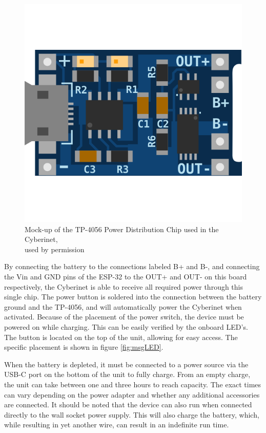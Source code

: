 \begin{center}
    \begin{figure}
        \centering
        \includegraphics[scale=0.3]{diagrams/1554633962.png}
        \caption{Mock-up of the TP-4056 Power Distribution Chip used in the Cyberinet,\\used by permission}
        \label{fig:tp5046} %
    \end{figure}
\end{center}

By connecting the battery to the connections labeled B+ and B-, and connecting the Vin and GND pins of the ESP-32 to the OUT+ and OUT- on this board respectively, the Cyberinet is able to receive all required power through this single chip. The power button is soldered into the connection between the battery ground and the TP-4056, and will automatically power the Cyberinet when activated. Because of the placement of the power switch, the device must be powered on while charging. This can be easily verified by the onboard LED's. The button is located on the top of the unit, allowing for easy access. The specific placement is shown in figure \ref{fig:msgLED}. 

When the battery is depleted, it must be connected to a power source via the USB-C port on the bottom of the unit to fully charge. From an empty charge, the unit can take between one and three hours to reach capacity. The exact times can vary depending on the power adapter and whether any additional accessories are connected. It should be noted that the device can also run when connected directly to the wall socket power supply. This will also charge the battery, which, while resulting in yet another wire, can result in an indefinite run time.

